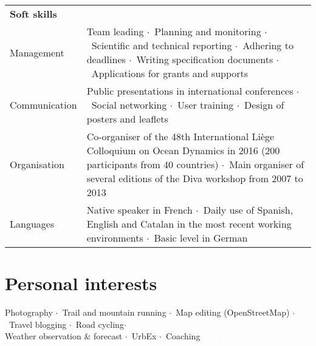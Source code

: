 \documentclass[10pt,a4paper,svgnames]{article}
\newcommand{\sepa}{$\cdot$~}
\begin{document}
\begin{tabular}{p{}| p{}}
\textbf{Soft skills} & \\

Management & Team leading \sepa Planning and monitoring \sepa Scientific and technical reporting \sepa Adhering to deadlines \sepa Writing specification documents \sepa Applications for grants and supports\\

Communication & Public presentations in international conferences \sepa Social networking \sepa User training \sepa Design of posters and leaflets\\

Organisation & Co-organiser of the 48th International Li\`{e}ge Colloquium on Ocean Dynamics in 2016 (200 participants from 40 countries) \sepa Main organiser of several editions of the Diva workshop from 2007 to 2013\\

Languages & Native speaker in French \sepa Daily use of Spanish, English and Catalan in the most recent working environments \sepa Basic level in German
\end{tabular}








\section*{Personal interests}

Photography \sepa Trail and mountain running \sepa Map editing (OpenStreetMap) \sepa Travel blogging \sepa Road cycling\sepa \\ Weather observation \& forecast \sepa UrbEx \sepa Coaching \hfill  \textcolor{white}{Last modified: \today}
\end{document}
